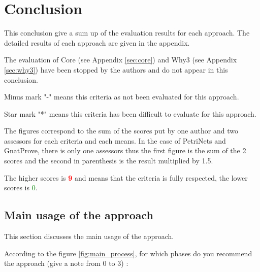 

\chapter{Conclusion}
\label{sec:concl}

This conclusion give a sum up of the evaluation results for each approach. The detailed results of each approach are given in the appendix.

The evaluation of Core (see Appendix \ref{sec:core}) and Why3 (see Appendix \ref{sec:why3}) have been stopped by the authors and do not appear in this conclusion.

Minus mark "-" means this criteria as not been evaluated for this approach.

Star mark "*" means this criteria has been difficult to evaluate for this approach.

The figures correspond to the sum of the scores put by one author and two assessors for each criteria and each means.
In the case of PetriNets and GnatProve, there is only one assessors thus the first figure is the sum of the 2 scores and the second in parenthesis is the result multiplied by 1.5.

The higher scores is \textcolor{red}{\textbf{9}} and means that the criteria is fully respected, the lower scores is \textcolor{green}{0}.

\section{Main usage of the approach}
\label{main_usage}
This section discusses the main usage of the approach.

According to the figure \ref{fig:main_process}, for which phases do you recommend the approach (give a note from 0 to  3) :

